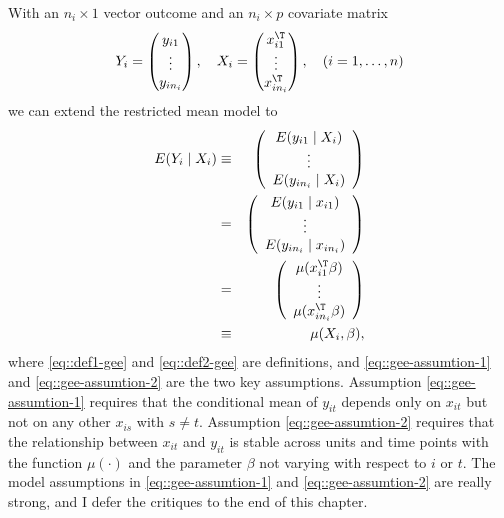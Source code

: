 With an $n_{i}\times1$ vector outcome and  an $n_{i}\times p$ covariate matrix
\begin{eqnarray}
\label{eq::individual-y-x}
Y_{i} = \begin{pmatrix}
y_{i1} \\
\vdots \\
y_{in_{i}}
\end{pmatrix},\quad 
X_{i} = \begin{pmatrix}
x_{i1}^{\T} \\
\vdots \\
x_{in_{i}}^{\T}
\end{pmatrix},\quad
(i=1,\ldots, n)
\end{eqnarray}
we can extend the restricted mean model to
\begin{eqnarray}
E(Y_{i}\mid X_{i}) 
&\equiv& \left(\begin{array}{c}
E(y_{i1}\mid X_{i})\\
\vdots\\
E(y_{in_{i}}\mid X_{i})
\end{array}\right)  \label{eq::def1-gee} \\
&=& \left(\begin{array}{c}
E(y_{i1}\mid x_{i1})\\
\vdots\\
E(y_{in_{i}}\mid x_{in_{i}})
\end{array}\right)  \label{eq::gee-assumtion-1} \\
&=&\left(\begin{array}{c}
\mu(x_{i1}^{\T}\beta)\\
\vdots\\
\mu(x_{in_{i}}^{\T}\beta)
\end{array}\right)   \label{eq::gee-assumtion-2} \\
&\equiv&\mu(X_{i},\beta), \label{eq::def2-gee}
\end{eqnarray}
where \eqref{eq::def1-gee} and \eqref{eq::def2-gee} are definitions, and \eqref{eq::gee-assumtion-1} and \eqref{eq::gee-assumtion-2}
are the two key assumptions. Assumption \eqref{eq::gee-assumtion-1} requires that the conditional mean of $y_{it}$ depends only on $x_{it}$
but not on any other $x_{is}$ with $s\neq t$. Assumption \eqref{eq::gee-assumtion-2} requires
that the relationship between $x_{it}$ and $y_{it}$ is stable across units and time points with the function $\mu(\cdot)$ and the parameter
$\beta$ not varying with respect to $i$ or $t$. The model assumptions in \eqref{eq::gee-assumtion-1} and \eqref{eq::gee-assumtion-2} 
are really strong, and I defer the critiques to the end of this chapter.
